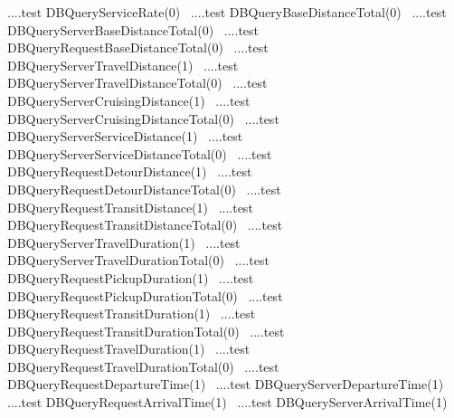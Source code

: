 \documentclass{article}
\def\nwendcode{\endtrivlist \endgroup}
\let\nwdocspar=\par
\theoremstyle{definition}
\begin{document}
\LA{}....test \code{}DBQueryServiceRate\edoc{}(0)~{\nwtagstyle{}}\RA{}
\LA{}....test \code{}DBQueryBaseDistanceTotal\edoc{}(0)~{\nwtagstyle{}}\RA{}
\LA{}....test \code{}DBQueryServerBaseDistanceTotal\edoc{}(0)~{\nwtagstyle{}}\RA{}
\LA{}....test \code{}DBQueryRequestBaseDistanceTotal\edoc{}(0)~{\nwtagstyle{}}\RA{}
\LA{}....test \code{}DBQueryServerTravelDistance\edoc{}(1)~{\nwtagstyle{}}\RA{}
\LA{}....test \code{}DBQueryServerTravelDistanceTotal\edoc{}(0)~{\nwtagstyle{}}\RA{}
\LA{}....test \code{}DBQueryServerCruisingDistance\edoc{}(1)~{\nwtagstyle{}}\RA{}
\LA{}....test \code{}DBQueryServerCruisingDistanceTotal\edoc{}(0)~{\nwtagstyle{}}\RA{}
\LA{}....test \code{}DBQueryServerServiceDistance\edoc{}(1)~{\nwtagstyle{}}\RA{}
\LA{}....test \code{}DBQueryServerServiceDistanceTotal\edoc{}(0)~{\nwtagstyle{}}\RA{}
\LA{}....test \code{}DBQueryRequestDetourDistance\edoc{}(1)~{\nwtagstyle{}}\RA{}
\LA{}....test \code{}DBQueryRequestDetourDistanceTotal\edoc{}(0)~{\nwtagstyle{}}\RA{}
\LA{}....test \code{}DBQueryRequestTransitDistance\edoc{}(1)~{\nwtagstyle{}}\RA{}
\LA{}....test \code{}DBQueryRequestTransitDistanceTotal\edoc{}(0)~{\nwtagstyle{}}\RA{}
\LA{}....test \code{}DBQueryServerTravelDuration\edoc{}(1)~{\nwtagstyle{}}\RA{}
\LA{}....test \code{}DBQueryServerTravelDurationTotal\edoc{}(0)~{\nwtagstyle{}}\RA{}
\LA{}....test \code{}DBQueryRequestPickupDuration\edoc{}(1)~{\nwtagstyle{}}\RA{}
\LA{}....test \code{}DBQueryRequestPickupDurationTotal\edoc{}(0)~{\nwtagstyle{}}\RA{}
\LA{}....test \code{}DBQueryRequestTransitDuration\edoc{}(1)~{\nwtagstyle{}}\RA{}
\LA{}....test \code{}DBQueryRequestTransitDurationTotal\edoc{}(0)~{\nwtagstyle{}}\RA{}
\LA{}....test \code{}DBQueryRequestTravelDuration\edoc{}(1)~{\nwtagstyle{}}\RA{}
\LA{}....test \code{}DBQueryRequestTravelDurationTotal\edoc{}(0)~{\nwtagstyle{}}\RA{}
\LA{}....test \code{}DBQueryRequestDepartureTime\edoc{}(1)~{\nwtagstyle{}}\RA{}
\LA{}....test \code{}DBQueryServerDepartureTime\edoc{}(1)~{\nwtagstyle{}}\RA{}
\LA{}....test \code{}DBQueryRequestArrivalTime\edoc{}(1)~{\nwtagstyle{}}\RA{}
\LA{}....test \code{}DBQueryServerArrivalTime\edoc{}(1)~{\nwtagstyle{}}\RA{}
\nwendcode{}\nwdocspar
\end{document}
